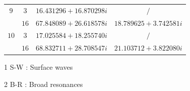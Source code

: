 \documentclass[aps,prd,longbibliography,reprint,twocolumn,amsmath,amssymb,amsfonts,showpacs,footnote,superscriptaddress]{revtex4-1}%
\begin{document}
\begin{table}[htp]
\begin{threeparttable}[htp]
\begin{ruledtabular}
\begin{tabular}{cccc}
$9$  & $3$  & $16.431296+16.870298 i $  & $/ $      \\
     & $16$ & $67.848089+26.618578 i $  & $18.789625+3.742581 i $
         \\

$10$  & $3$  & $17.025584+18.255740 i $  & $/ $     \\
     & $16$  & $68.832711+28.708547 i  $  & $21.103712+3.822080 i $
        \\
\end{tabular}
\end{ruledtabular}
\begin{tablenotes}
     \item[1] S-W : Surface waves
     \item[2] B-R : Broad resonances
   \end{tablenotes}
\end{threeparttable}
\end{table}
\endgroup
\end{document}
